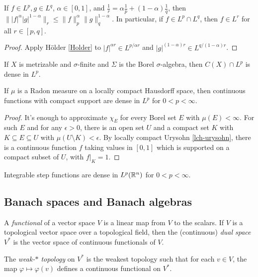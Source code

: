 \begin{prop} If $f \in L^p, g \in L^q$, $\alpha \in [0,1]$, and $\frac{1}{r} = \alpha \frac{1}{p} + (1-\alpha) \frac{1}{q}$, then $\||f|^{\alpha}|g|^{1-\alpha}\|_r \le \|f\|_p^{\alpha}\|g\|_q^{1-\alpha}$. In particular, if $f \in L^p\cap L^q$, then $f \in L^r$ for all $r \in [p,q]$.
\end{prop}
\begin{proof} Apply H\"older \ref{Holder} to $|f|^{\alpha r} \in L^{p/\alpha r}$ and $|g|^{(1-\alpha)r} \in L^{q/(1-\alpha)r}$.
\end{proof}

\begin{prop} If $X$ is metrizable and $\sigma$-finite and $\Sigma$ is the Borel $\sigma$-algebra, then $C(X) \cap L^p$ is dense in $L^p$.
\end{prop}

\begin{prop} If $\mu$ is a Radon measure on a locally compact Hausdorff space, then continuous functions with compact support are dense in $L^p$ for $0 < p < \infty$.
\end{prop}
\begin{proof} It's enough to approximate $\chi_E$ for every Borel set $E$ with $\mu(E) < \infty$. For such $E$ and for any $\epsilon > 0$, there is an open set $U$ and a compact set $K$ with $K \subseteq E \subseteq U$ with $\mu(U\setminus K) < \epsilon$. By locally compact Urysohn \ref{lch-urysohn}, there is a continuous function $f$ taking values in $[0,1]$ which is supported on a compact subset of $U$, with $f|_K = 1$.
\end{proof}

\begin{cor} Integrable step functions are dense in $L^p(\mathbb{R}^n)$ for $0 < p < \infty$.
\end{cor}


\subsection{Banach spaces and Banach algebras}

\begin{defn} A \emph{functional} of a vector space $V$ is a linear map from $V$ to the scalars. If $V$ is a topological vector space over a topological field, then the (continuous) \emph{dual space} $V^*$ is the vector space of continuous functionals of $V$.

The \emph{weak-$*$ topology} on $V^*$ is the weakest topology such that for each $v \in V$, the map $\varphi \mapsto \varphi(v)$ defines a continuous functional on $V^*$.
\end{defn}

